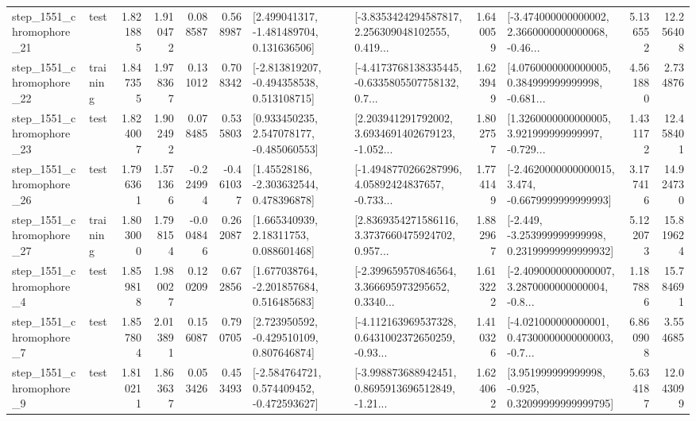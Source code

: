 \begin{tabular}{llrrrrllrlrr}
 step\_1551\_chromophore\_21 &      test &      1.821885 &    1.910472 &      0.088587 &  0.568987 &    [2.499041317, -1.481489704, 0.131636506] &  [-3.8353424294587817, 2.256309048102555, 0.419... &       1.640059 &  [-3.474000000000002, 2.3660000000000068, -0.46... &            5.136552 &         12.256408 \\
 step\_1551\_chromophore\_22 &  training &      1.847355 &    1.978367 &      0.131012 &  0.708342 &   [-2.813819207, -0.494358538, 0.513108715] &  [-4.4173768138335445, -0.6335805507758132, 0.7... &       1.623949 &  [4.0760000000000005, 0.384999999999998, -0.681... &            4.561880 &          2.734876 \\
 step\_1551\_chromophore\_23 &      test &      1.824007 &    1.902492 &      0.078485 &  0.535803 &    [0.933450235, 2.547078177, -0.485060553] &  [2.203941291792002, 3.6934691402679123, -1.052... &       1.802757 &  [1.3260000000000005, 3.921999999999997, -0.729... &            1.431172 &         12.458401 \\
 step\_1551\_chromophore\_26 &      test &      1.796361 &    1.571366 &     -0.224994 & -0.461037 &     [1.45528186, -2.303632544, 0.478396878] &  [-1.4948770266287996, 4.05892424837657, -0.733... &       1.774149 &  [-2.4620000000000015, 3.474, -0.6679999999999993] &            3.177416 &         14.924730 \\
 step\_1551\_chromophore\_27 &  training &      1.803000 &    1.798154 &     -0.004846 &  0.262087 &      [1.665340939, 2.18311753, 0.088601468] &  [2.8369354271586116, 3.3737660475924702, 0.957... &       1.882967 &  [-2.449, -3.253999999999998, 0.23199999999999932] &            5.122073 &         15.819624 \\
  step\_1551\_chromophore\_4 &      test &      1.859818 &    1.980027 &      0.120209 &  0.672856 &    [1.677038764, -2.201857684, 0.516485683] &  [-2.399659570846564, 3.366695973295652, 0.3340... &       1.613222 &  [-2.4090000000000007, 3.2870000000000004, -0.8... &            1.187886 &         15.784691 \\
  step\_1551\_chromophore\_7 &      test &      1.857804 &    2.013891 &      0.156087 &  0.790705 &    [2.723950592, -0.429510109, 0.807646874] &  [-4.112163969537328, 0.6431002372650259, -0.93... &       1.410326 &  [-4.021000000000001, 0.47300000000000003, -0.7... &            6.860908 &          3.554685 \\
  step\_1551\_chromophore\_9 &      test &      1.810211 &    1.863637 &      0.053426 &  0.453493 &   [-2.584764721, 0.574409452, -0.472593627] &  [-3.998873688942451, 0.8695913696512849, -1.21... &       1.624062 &   [3.951999999999998, -0.925, 0.32099999999999795] &            5.634187 &         12.043099 \\

\end{tabular}
